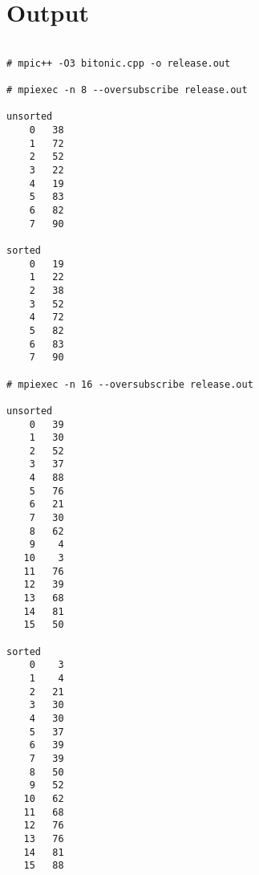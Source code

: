 \documentclass{article}
\begin{document}
\pagebreak
\section*{Output}

\begin{lstlisting}[showstringspaces=false]

# mpic++ -O3 bitonic.cpp -o release.out

# mpiexec -n 8 --oversubscribe release.out

unsorted
    0   38
    1   72
    2   52
    3   22
    4   19
    5   83
    6   82
    7   90

sorted
    0   19
    1   22
    2   38
    3   52
    4   72
    5   82
    6   83
    7   90

# mpiexec -n 16 --oversubscribe release.out

unsorted
    0   39
    1   30
    2   52
    3   37
    4   88
    5   76
    6   21
    7   30
    8   62
    9    4
   10    3
   11   76
   12   39
   13   68
   14   81
   15   50

sorted
    0    3
    1    4
    2   21
    3   30
    4   30
    5   37
    6   39
    7   39
    8   50
    9   52
   10   62
   11   68
   12   76
   13   76
   14   81
   15   88
\end{lstlisting}
\end{document}
